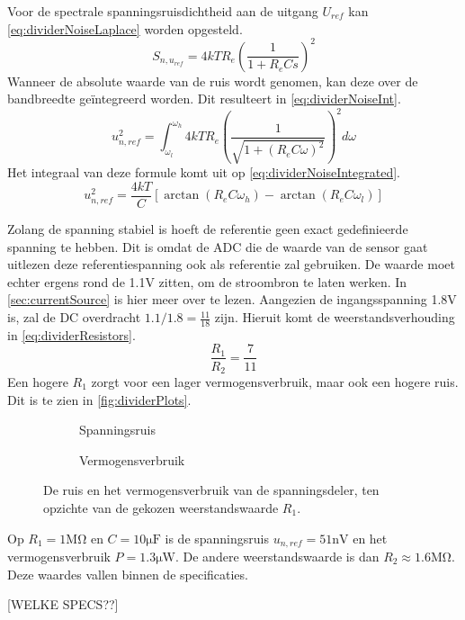\noindent
Voor de spectrale spanningsruisdichtheid aan de uitgang $U_{ref}$ kan \autoref{eq:dividerNoiseLaplace} worden opgesteld.
\begin{equation}\label{eq:dividerNoiseLaplace}
    S_{n,u_{ref}} = 4kTR_e\left(\frac{1}{1 + R_eCs}\right)^2
\end{equation}
Wanneer de absolute waarde van de ruis wordt genomen, kan deze over de bandbreedte geïntegreerd worden. Dit resulteert in \autoref{eq:dividerNoiseInt}.
\begin{equation}\label{eq:dividerNoiseInt}
    u_{n,ref}^2 = \int_{\omega_l}^{\omega_h} 4kTR_e\left(\frac{1}{\sqrt{1 + (R_eC\omega)^2}}\right)^2 d\omega
\end{equation}
Het integraal van deze formule komt uit op \autoref{eq:dividerNoiseIntegrated}.
\begin{equation}\label{eq:dividerNoiseIntegrated}
    u_{n,ref}^2 = \frac{4kT}{C}\left[\arctan(R_eC\omega_h) - \arctan(R_eC\omega_l)\right]
\end{equation}

Zolang de spanning stabiel is hoeft de referentie geen exact gedefinieerde spanning te hebben. Dit is omdat de ADC die de waarde van de sensor gaat uitlezen deze referentiespanning ook als referentie zal gebruiken. De waarde moet echter ergens rond de 1.1V zitten, om de stroombron te laten werken.
In \autoref{sec:currentSource} is hier meer over te lezen.
Aangezien de ingangsspanning 1.8V is, zal de DC overdracht $1.1 / 1.8 = \frac{11}{18}$ zijn. Hieruit komt de weerstandsverhouding in \autoref{eq:dividerResistors}.
\begin{equation}\label{eq:dividerResistors}
    \frac{R_1}{R_2} = \frac{7}{11}
\end{equation}
Een hogere $R_1$ zorgt voor een lager vermogensverbruik, maar ook een hogere ruis. Dit is te zien in \autoref{fig:dividerPlots}.

\begin{figure}
    \centering
    \begin{subfigure}[b]{0.45\textwidth}
        \centering
        
        \caption{Spanningsruis}
        \label{fig:dividerNoisePlot}
    \end{subfigure}
    \hfill
    \begin{subfigure}[b]{0.45\textwidth}
        \centering
        
        \caption{Vermogensverbruik}
        \label{fig:dividerPower}
    \end{subfigure}
    \caption{De ruis en het vermogensverbruik van de spanningsdeler, ten opzichte van de gekozen weerstandswaarde $R_1$.}
    \label{fig:dividerPlots}
\end{figure}
Op $R_1 = 1\si{\mega\ohm}$ en $C = 10\si{\micro\farad}$ is de spanningsruis $u_{n,ref} = 51\si{\nano\volt}$ en het vermogensverbruik $P = 1.3\si{\micro\watt}$. De andere weerstandswaarde is dan $R_2 \approx 1.6 \si{\mega\ohm}$. Deze waardes vallen binnen de specificaties.

[WELKE SPECS??]
